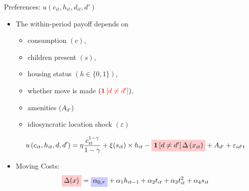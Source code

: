 \documentclass[12pt,english, aspectratio=169]{beamer}
\begin{document}
\begin{frame}{Preferences: $u(c_{it},h_{it},d_{it},d')$}
\begin{itemize}
\item The within-period payoff depends on 

\begin{itemize}
\item consumption $(c)$, 
\item children present $(s)$, 
\item housing status $(h\in\{0,1\})$, 
\item whether move is made \textrm{$\left({\color{red}{\mathbf{1}\left[d\neq d'\right]}}\right)$,}
\item amenities ($A_{d'}$)
\item idiosyncratic location shock $\left(\varepsilon\right)$
\end{itemize}
\[
u\left(c_{it},h_{it},d,d'\right)=\eta \frac{c_{it}^{1-\gamma}}{1-\gamma} + \xi(s_{it})\times h_{it} - 
\tikz[baseline]{
            \node[fill=red!20,anchor=base] (t1)
            {$ \mathbf{1}\left[d\neq d'\right]\Delta\left(x_{it}\right) $};
        } +A_{d'}+\varepsilon_{id't}
\]

\item Moving Costs:
\[
\tikz[baseline]{
            \node[fill=red!20,anchor=base] (t2)
            {$ \Delta(x)$};
            } = 
\tikz[baseline]{
            \node[fill=blue!20,anchor=base] (t3)
            {$ \alpha_{0,\tau}$};
            }  
+\alpha_{1} h_{it-1}+\alpha_{2}t_{it}+\alpha_{3}t_{it}^{2}+\alpha_{4}s_{it}
\]

\end{itemize}
\end{frame}
\end{document}
